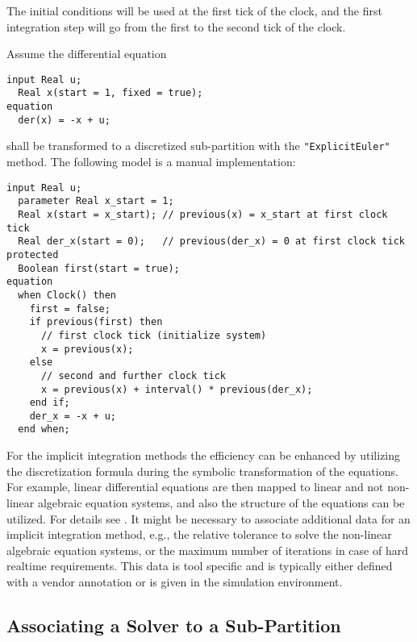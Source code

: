 The initial conditions will be used at the first tick of the clock, and the first integration step will go from the first to the second tick of the clock.

\begin{example}
Assume the differential equation
\begin{lstlisting}[language=modelica]
  input Real u;
  Real x(start = 1, fixed = true);
equation
  der(x) = -x + u;
\end{lstlisting}
shall be transformed to a discretized sub-partition with the \lstinline!"ExplicitEuler"! method.
The following model is a manual implementation:
\begin{lstlisting}[language=modelica]
  input Real u;
  parameter Real x_start = 1;
  Real x(start = x_start); // previous(x) = x_start at first clock tick
  Real der_x(start = 0);   // previous(der_x) = 0 at first clock tick
protected
  Boolean first(start = true);
equation
  when Clock() then
    first = false;
    if previous(first) then
      // first clock tick (initialize system)
      x = previous(x);
    else
      // second and further clock tick
      x = previous(x) + interval() * previous(der_x);
    end if;
    der_x = -x + u;
  end when;
\end{lstlisting}
\end{example}

\begin{nonnormative}
For the implicit integration methods the efficiency can be enhanced by utilizing the discretization formula during the symbolic transformation of the equations.
For example, linear differential equations are then mapped to linear and not non-linear algebraic equation systems, and also the structure of the equations can be utilized.
For details see \textcite{ElmqvistOtterCellier1995InlineIntegration}.
It might be necessary to associate additional data for an implicit integration method, e.g., the relative tolerance to solve the non-linear algebraic equation systems, or the maximum number of iterations in case of hard realtime requirements.
This data is tool specific and is typically either defined with a vendor annotation or is given in the simulation environment.
\end{nonnormative}

\subsection{Associating a Solver to a Sub-Partition}\label{associating-a-solver-to-a-partition}

